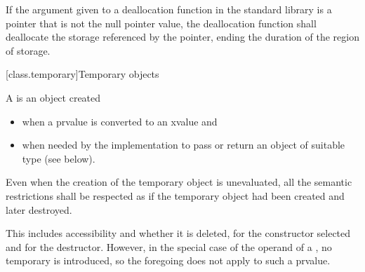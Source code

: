 \pnum
If the argument given to a deallocation function in the standard library
is a pointer that is not the null pointer value, the
deallocation function shall deallocate the storage referenced by the
pointer, ending the duration of the region of storage.

[class.temporary]{Temporary objects}

\pnum
{}%
%
%
%
A  is an object created
\begin{itemize}
\item
when a prvalue is converted to an xvalue and
\item
when needed by the implementation to pass or return an object of suitable type (see below).
\end{itemize}
Even when the creation of the temporary object is
unevaluated,
all the semantic restrictions shall be respected as if the temporary object
had been created and later destroyed.
\begin{note}
This includes accessibility and whether it is deleted,
for the constructor selected and for the destructor. However, in the special
case of the operand of a
, no temporary is introduced,
so the foregoing does not apply to such a prvalue.
\end{note}

